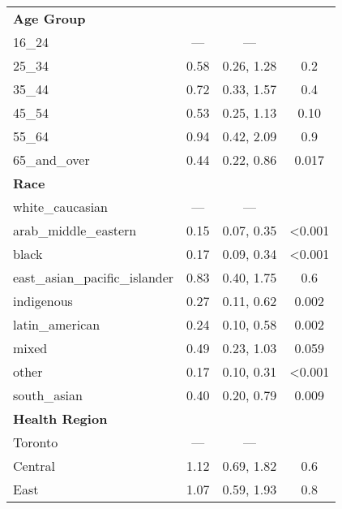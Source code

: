 \documentclass[
  letterpaper,
  DIV=11,
  numbers=noendperiod]{scrartcl}
\begin{document}
\begin{longtable}{lccc}
\endfoot
\bottomrule
\endlastfoot
\textbf{Age Group} &  &  & \\
\hspace{1em}16\_24 & — & — & \\
\hspace{1em}25\_34 & 0.58 & 0.26, 1.28 & 0.2\\
\hspace{1em}35\_44 & 0.72 & 0.33, 1.57 & 0.4\\
\hspace{1em}45\_54 & 0.53 & 0.25, 1.13 & 0.10\\
\addlinespace
\hspace{1em}55\_64 & 0.94 & 0.42, 2.09 & 0.9\\
\hspace{1em}65\_and\_over & 0.44 & 0.22, 0.86 & 0.017\\
\textbf{Race} &  &  & \\
\hspace{1em}white\_caucasian & — & — & \\
\hspace{1em}arab\_middle\_eastern & 0.15 & 0.07, 0.35 & <0.001\\
\addlinespace
\hspace{1em}black & 0.17 & 0.09, 0.34 & <0.001\\
\hspace{1em}east\_asian\_pacific\_islander & 0.83 & 0.40, 1.75 & 0.6\\
\hspace{1em}indigenous & 0.27 & 0.11, 0.62 & 0.002\\
\hspace{1em}latin\_american & 0.24 & 0.10, 0.58 & 0.002\\
\hspace{1em}mixed & 0.49 & 0.23, 1.03 & 0.059\\
\addlinespace
\hspace{1em}other & 0.17 & 0.10, 0.31 & <0.001\\
\hspace{1em}south\_asian & 0.40 & 0.20, 0.79 & 0.009\\
\textbf{Health Region} &  &  & \\
\hspace{1em}Toronto & — & — & \\
\hspace{1em}Central & 1.12 & 0.69, 1.82 & 0.6\\
\addlinespace
\hspace{1em}East & 1.07 & 0.59, 1.93 & 0.8\\

\end{longtable}
\end{document}
